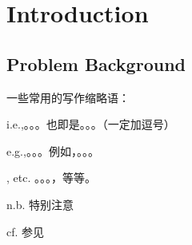 \documentclass[12pt]{ctexart}
\begin{document}
\maketitle  %

\tableofcontents  %




\section{Introduction}
\subsection{Problem Background}%
一些常用的写作缩略语：

i.e.,。。。也即是。。。（一定加逗号）

e.g.,。。。例如，。。。

, etc.    。。。，等等。

n.b.   特别注意

cf.  参见
\end{document}
